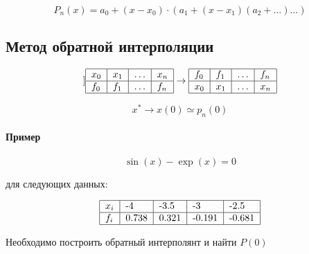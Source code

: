 \documentclass[10pt,a4paper]{article}
\begin{document}
	\begin{equation}
		P_{n}\left(x\right) = a_{0} + \left(x - x_{0}\right)\cdot \left(a_{1} + 
		\left(x - x_{1}\right)\left(a_{2} + \ldots \right)\ldots\right)
	\end{equation}
	
	\subsection{Метод обратной интерполяции}
	
	\begin{equation}]
		\centering
	\begin{tabular}{|l|l|l|l|}
	\hline
		$x_{0}$ & $x_{1}$ & $\ldots$ & $x_{n}$ \\ \hline
		$f_{0}$ & $f_{1}$ & $\ldots$ & $f_{n}$ \\ \hline
	\end{tabular} 
	\rightarrow 
	\centering
	\begin{tabular}{|l|l|l|l|}
	\hline
		$f_{0}$ & $f_{1}$ & $\ldots$ & $f_{n}$ \\ \hline
		$x_{0}$ & $x_{1}$ & $\ldots$ & $x_{n}$ \\ \hline
	\end{tabular} 
	\end{equation}	
	
	\begin{equation}
		x^{*} \rightarrow x\left(0\right)\simeq p_{n}\left(0\right)
	\end{equation}
	
	\paragraph{Пример}
	
	\begin{equation}
		\sin\left(x\right) - \exp\left(x\right) = 0
	\end{equation}
	
	для следующих данных:
	
	\begin{equation}
		\begin{tabular}{|l|l|l|l|l|}
	\hline
		$x_{i}$ & -4 & -3.5 & -3 & -2.5 \\ \hline
		$f_{i}$ & 0.738 & 0.321 & -0.191 & -0.681 \\ \hline
	\end{tabular} 
	\end{equation}
	
	Необходимо построить обратный интерполянт и найти $P\left(0\right)$
	
\end{document}
